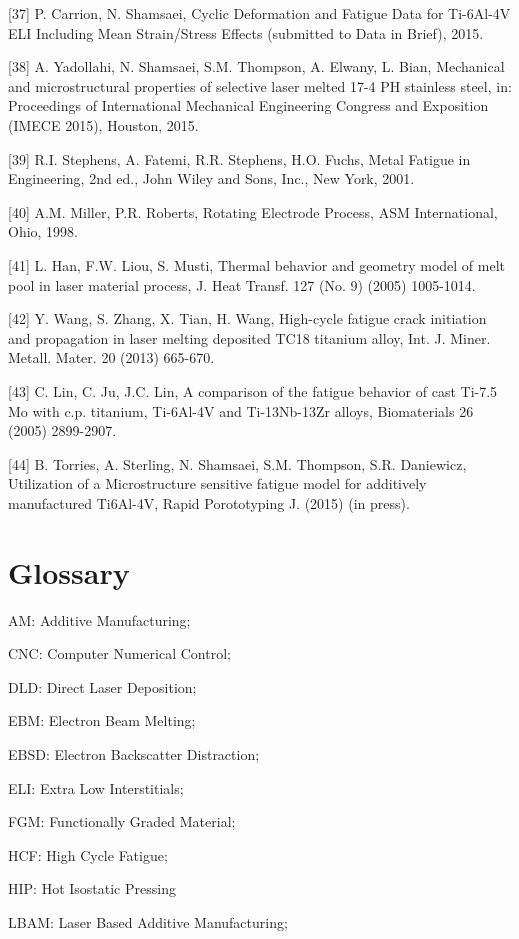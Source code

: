 \documentclass[10pt]{article}
\begin{document}
[37] P. Carrion, N. Shamsaei, Cyclic Deformation and Fatigue Data for Ti-6Al-4V ELI Including Mean Strain/Stress Effects (submitted to Data in Brief), 2015.

[38] A. Yadollahi, N. Shamsaei, S.M. Thompson, A. Elwany, L. Bian, Mechanical and microstructural properties of selective laser melted 17-4 PH stainless steel, in: Proceedings of International Mechanical Engineering Congress and Exposition (IMECE 2015), Houston, 2015.

[39] R.I. Stephens, A. Fatemi, R.R. Stephens, H.O. Fuchs, Metal Fatigue in Engineering, 2nd ed., John Wiley and Sons, Inc., New York, 2001.

[40] A.M. Miller, P.R. Roberts, Rotating Electrode Process, ASM International, Ohio, 1998.

[41] L. Han, F.W. Liou, S. Musti, Thermal behavior and geometry model of melt pool in laser material process, J. Heat Transf. 127 (No. 9) (2005) 1005-1014.

[42] Y. Wang, S. Zhang, X. Tian, H. Wang, High-cycle fatigue crack initiation and propagation in laser melting deposited TC18 titanium alloy, Int. J. Miner. Metall. Mater. 20 (2013) 665-670.

[43] C. Lin, C. Ju, J.C. Lin, A comparison of the fatigue behavior of cast Ti-7.5 Mo with c.p. titanium, Ti-6Al-4V and Ti-13Nb-13Zr alloys, Biomaterials 26 (2005) 2899-2907.

[44] B. Torries, A. Sterling, N. Shamsaei, S.M. Thompson, S.R. Daniewicz, Utilization of a Microstructure sensitive fatigue model for additively manufactured Ti6Al-4V, Rapid Porototyping J. (2015) (in press).

\section*{Glossary}
AM: Additive Manufacturing;

CNC: Computer Numerical Control;

DLD: Direct Laser Deposition;

EBM: Electron Beam Melting;

EBSD: Electron Backscatter Distraction;

ELI: Extra Low Interstitials;

FGM: Functionally Graded Material;

HCF: High Cycle Fatigue;

HIP: Hot Isostatic Pressing

LBAM: Laser Based Additive Manufacturing;
\end{document}
